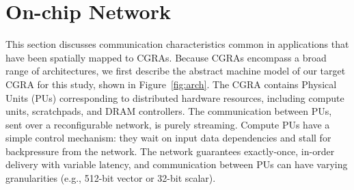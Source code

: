 \section{On-chip Network}

This section discusses communication characteristics common in
applications that have been spatially mapped to CGRAs. %
Because CGRAs encompass a broad range of architectures, we first describe the abstract machine model
of our target CGRA for this study, shown in  Figure~\ref{fig:arch}.
The CGRA contains Physical Units (PUs) corresponding to distributed hardware resources, including compute units, scratchpads, and DRAM controllers.
The communication between PUs, sent over a reconfigurable network, is purely streaming.
Compute PUs have a simple control mechanism: they wait on input data dependencies and stall for backpressure from the network. 
The network guarantees exactly-once, in-order delivery with variable latency, and communication between PUs can have varying granularities (e.g., 512-bit vector or 32-bit scalar).

